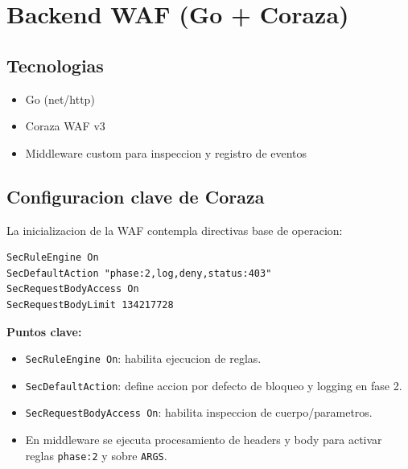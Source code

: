 \documentclass[12pt,a4paper]{article}
\begin{document}
\section{Backend WAF (Go + Coraza)}
\subsection{Tecnologias}
\begin{itemize}
  \item Go (net/http)
  \item Coraza WAF v3
  \item Middleware custom para inspeccion y registro de eventos
\end{itemize}

\subsection{Configuracion clave de Coraza}
La inicializacion de la WAF contempla directivas base de operacion:

\begin{lstlisting}
SecRuleEngine On
SecDefaultAction "phase:2,log,deny,status:403"
SecRequestBodyAccess On
SecRequestBodyLimit 134217728
\end{lstlisting}

\textbf{Puntos clave:}
\begin{itemize}
  \item \texttt{SecRuleEngine On}: habilita ejecucion de reglas.
  \item \texttt{SecDefaultAction}: define accion por defecto de bloqueo y logging en fase 2.
  \item \texttt{SecRequestBodyAccess On}: habilita inspeccion de cuerpo/parametros.
  \item En middleware se ejecuta procesamiento de headers y body para activar reglas \texttt{phase:2} y sobre \texttt{ARGS}.
\end{itemize}
\end{document}
